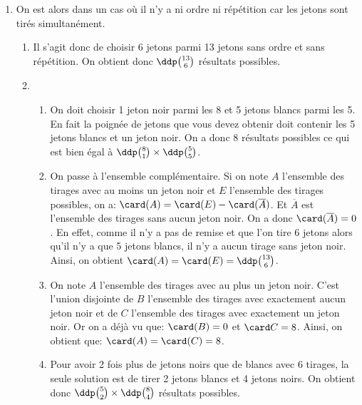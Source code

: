 \documentclass[a4paper, 11pt,reqno]{article}
\begin{document}
\begin{correction}
\begin{enumerate}
\begin{enumerate}
\begin{enumerate}
\end{enumerate}
\end{enumerate}
\item On est alors dans un cas o\`u il n'y a ni ordre ni r\'ep\'etition car les jetons sont tir\'es simultan\'ement.
\begin{enumerate}
\item Il s'agit donc de choisir 6 jetons parmi 13 jetons sans ordre et sans r\'ep\'etition. On obtient donc $\ddp \binom{13}{6}$ r\'esultats possibles.
\item 
\begin{enumerate}
\item On doit choisir 1 jeton noir parmi les 8 et 5 jetons blancs parmi les 5. En fait la poign\'ee de jetons que vous devez obtenir doit contenir les 5 jetons blancs et un jeton noir. On a donc $8$ r\'esultats possibles ce qui est bien \'egal \`a $\ddp \binom{8}{1}\times \ddp \binom{5}{5}$.
\item On passe \`a l'ensemble compl\'ementaire. Si on note $A$ l'ensemble des tirages avec au moins un jeton noir et $E$ l'ensemble des tirages possibles, on a: $\card (A)=\card (E)-\card (\overline{A})$. Et $\overline{A}$ est l'ensemble des tirages sans aucun jeton noir.  On a donc $\card (\overline{A})=0$. En effet, comme il n'y a pas de remise et que l'on tire 6 jetons alors qu'il n'y a que 5 jetons blancs, il n'y a aucun tirage sans jeton noir. Ainsi, on obtient $\card (A)=\card (E)=\ddp \binom{13}{6}$.
\item On note $A$ l'ensemble des tirages avec au plus un jeton noir. C'est l'union disjointe de $B$ l'ensemble des tirages avec exactement aucun jeton noir et de $C$ l'ensemble des tirages avec exactement un jeton noir. Or on a d\'ej\`a vu que: $\card (B)=0$ et $\card C=8$. Ainsi, on obtient que: $\card (A)=\card (C)= 8$.
\item Pour avoir 2 fois plus de jetons noirs que de blancs avec 6 tirages, la seule solution est de tirer 2 jetons blancs et 4 jetons noirs. On obtient donc $\ddp \binom{5}{2} \times \ddp \binom{8}{4}$ r\'esultats possibles.
\end{enumerate}
\end{enumerate}
\end{enumerate}
\end{correction}
\end{document}
